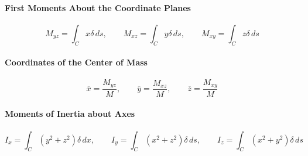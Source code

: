 \paragraph{First Moments About the Coordinate Planes}
\[M_{yz} = \int_C x \delta \, ds, \qquad M_{xz} = \int_C y\delta \, ds, \qquad M_{xy} = \int_C z\delta \, ds\]
\paragraph{Coordinates of the Center of Mass}
\[\bar x = \frac{M_{yz}}{M}, \qquad \bar y = \frac{M_{xz}}{M}, \qquad \bar z = \frac{M_{xy}}{M}\]
\paragraph{Moments of Inertia about Axes}
\[I_x = \int_C (y^2+z^2)\delta \, dx, \qquad I_y = \int_C (x^2+z^2) \delta \, ds, \qquad I_z = \int_C (x^2+y^2)\delta \, ds\]